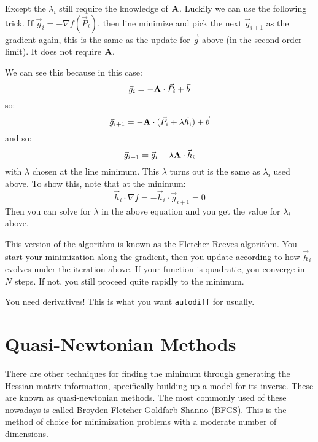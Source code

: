 Except the $\lambda_i$ still require the knowledge of
${\bf A}$. Luckily we can use the following trick. If $\vec{g}_i = -
\nabla f(\vec{P}_i)$, then line minimize and pick the next
$\vec{g}_{i+1}$ as the gradient again, this is the same as the update
for $\vec{g}$ above (in the second order limit). It does not require
${\bf A}$.

We can see this because in this case:
\begin{equation}
\vec{g}_i = - {\bf A}\cdot\vec{P}_i + \vec{b}
\end{equation}
so:
\begin{equation}
\vec{g}_{i+1} = - {\bf A}\cdot (\vec{P}_i + \lambda \vec{h}_i) + \vec{b}
\end{equation}
and so:
\begin{equation}
\vec{g}_{i+1} = \vec{g}_i - \lambda {\bf A}\cdot\vec{h}_i
\end{equation}
with $\lambda$ chosen at the line minimum. This $\lambda$ turns out is
the same as $\lambda_i$ used above. To show this, note that at the
minimum:
\begin{equation}
  \vec{h}_i\cdot \nabla f = -\vec{h}_i \cdot \vec{g}_{i+1}  = 0
\end{equation}
Then you can solve for $\lambda$ in the above equation and you get the
value for $\lambda_i$ above.

This version of the algorithm is known as the Fletcher-Reeves
algorithm. You start your minimization along the gradient, then you
update according to how $\vec{h}_i$ evolves under the iteration
above. If your function is quadratic, you converge in $N$ steps. If
not, you still proceed quite rapidly to the minimum.

You need derivatives! This is what you want {\tt autodiff} for
usually.

\section{Quasi-Newtonian Methods}

There are other techniques for finding the minimum through generating
the Hessian matrix information, specifically building up a model for
its inverse. These are known as quasi-newtonian methods. The most
commonly used of these nowadays is called
Broyden-Fletcher-Goldfarb-Shanno (BFGS).  This is the method of choice
for minimization problems with a moderate number of dimensions.

